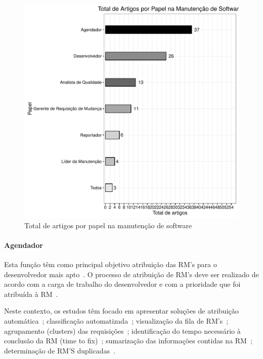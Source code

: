 \begin{figure}[htpb] \centering
	\includegraphics[width=0.8\linewidth]{chapter-mapeamento-sistematico/img/grafico_papel_por_artigo.pdf}
	\caption{Total de artigos por papel na manutenção de
		software}\label{fig:graf_papel_por_artigo} \end{figure}

\paragraph{Agendador} Esta função têm como principal objetivo atribuição das
RM’s para o desenvolvedor mais apto~\cite{banitaan2013decoba}. O processo de
atribuição de RM's deve ser realizado de acordo com a carga de trabalho do
desenvolvedor e com a prioridade que foi atribuída à
RM~\cite{chawla2015automated}.

Neste contexto, os estudos têm focado em apresentar soluções de atribuição
automática~\cite{banitaan2013decoba, shokripour2012automatic, somasundaram2012automatic, Naguib2013, Zhang2014, Zanetti2013};
classificação automatizada~\cite{gegick2010identifying,liu2014faceted, behl2014bug, chawla2015automated,tian2015automated}; visualização da fila de
RM's~\cite{izquierdo2015gila}; agrupamento (clusters) das
requisições~\cite{liu2014faceted}; identificação do tempo necessário à conclusão
da RM (time to fix)~\cite{hosseini2012market,
	Bhattacharya:2011:BTP:1985441.1985472}; sumarização das informações contidas
na RM~\cite{mani2012ausum}; determinação de RM'S duplicadas~\cite{Sun2011,
	Wu2011a}.

